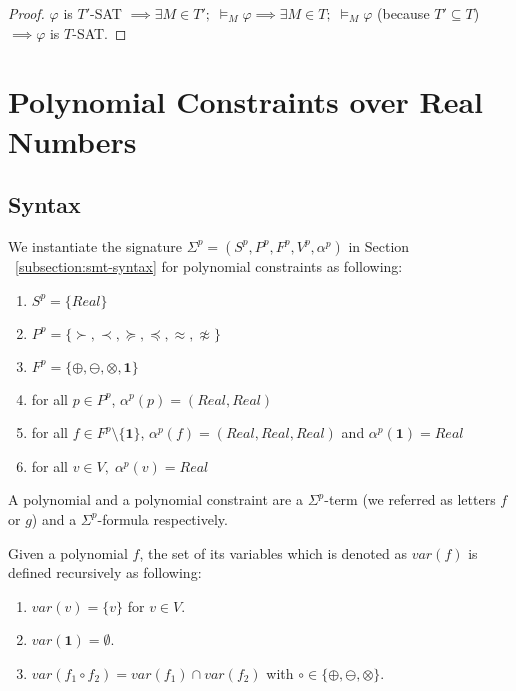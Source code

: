 \begin{proof}
$\varphi$ is $T'$-SAT $\implies \exists M \in T'; \; \models_M \varphi \implies \exists M \in T; \; \models_M \varphi$ (because $T' \subseteq T$) $\implies \varphi$ is $T$-SAT.
\end{proof}

\section{Polynomial Constraints over Real Numbers}
\subsection{Syntax}
We instantiate the signature $\Sigma^p = (S^p, P^p, F^p, V^p, \alpha^p)$ in Section ~\ref{subsection:smt-syntax} for polynomial constraints as following:
\begin{enumerate}
\item $S^p = \{Real\}$
\item $P^p = \{\succ, \prec, \succeq, \preceq, \approx, \not\approx\}$
\item $F^p = \{\oplus, \ominus, \otimes, \mathbf{1}\}$
\item for all $p \in P^p$, $\alpha^p(p) = (Real, Real)$
\item for all $f \in F^p\setminus \{\mathbf{1}\}$, $\alpha^p(f) = (Real, Real, Real)$ and $\alpha^p(\mathbf{1})=Real$
\item for all $v \in V, \; \alpha^p(v) = Real$
\end{enumerate}
A polynomial and a polynomial constraint are a $\Sigma^p$-term (we referred as letters $f$ or $g$) and a $\Sigma^p$-formula respectively. 


\begin{definition}
Given a polynomial $f$, the set of its variables which is denoted as $var(f)$ is defined recursively as following:
\begin{enumerate}
\item $var(v) = \{v\}$ for $v \in V$.
\item $var(\mathbf{1}) = \emptyset$.
\item $var(f_1 \circ f_2) = var(f_1) \cap var(f_2)$ with $\circ \in \{\oplus, \ominus, \otimes\}$.
\end{enumerate}
\end{definition}

